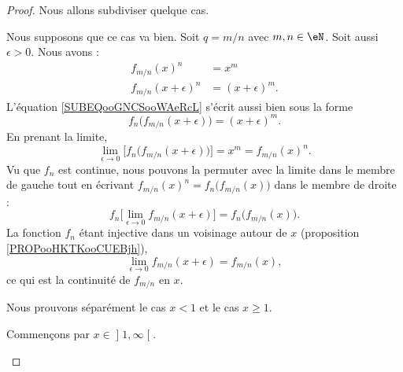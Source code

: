 \begin{proof}
	Nous allons subdiviser quelque cas.
	\begin{subproof}
		Nous supposons que ce cas va bien.      %
		Soit \( q=m/n\) avec \( m,n\in \eN\). Soit aussi \( \epsilon>0\). Nous avons :
		\begin{subequations}
			\begin{align}
				f_{m/n}(x)^n          & =x^m                                              \\
				f_{m/n}(x+\epsilon)^n & =(x+\epsilon)^m.      \label{SUBEQooGNCSooWAeRcL}
			\end{align}
		\end{subequations}
		L'équation \eqref{SUBEQooGNCSooWAeRcL} s'écrit aussi bien sous la forme
		\begin{equation}
			f_n\big( f_{m/n}(x+\epsilon) \big)=(x+\epsilon)^m.
		\end{equation}
		En prenant la limite,
		\begin{equation}
			\lim_{\epsilon\to 0}\big[ f_n\big( f_{m/n}(x+\epsilon) \big) \big]=x^m=f_{m/n}(x)^n.
		\end{equation}
		Vu que \( f_n\) est continue, nous pouvons la permuter avec la limite dans le membre de gauche tout en écrivant \( f_{m/n}(x)^n=f_n\big( f_{m/n}(x) \big)\) dans le membre de droite :
		\begin{equation}
			f_n\big[ \lim_{\epsilon\to 0}f_{m/n}(x+\epsilon) \big]=f_n\big( f_{m/n}(x) \big).
		\end{equation}
		La fonction \( f_n\) étant injective dans un voisinage autour de \( x\) (proposition \ref{PROPooHKTKooCUEBjh}),
		\begin{equation}
			\lim_{\epsilon\to 0}f_{m/n}(x+\epsilon)=f_{m/n}(x),
		\end{equation}
		ce qui est la continuité de \( f_{m/n}\) en \( x\).


		Nous prouvons séparément le cas \( x<1\) et le cas \( x\geq 1\).

		\begin{subproof}

			Commençons par \( x\in \mathopen\rbrack 1 , \infty \mathclose\lbrack\).


\end{subproof}
\end{subproof}
\end{proof}
